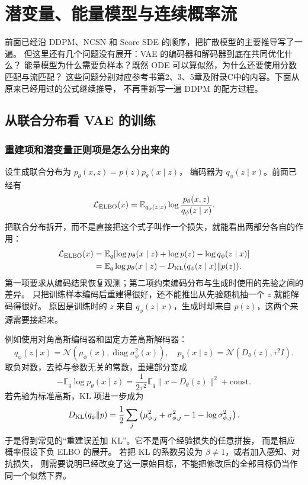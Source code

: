 \chapter{潜变量、能量模型与连续概率流}
\label{supp:objectives}

前面已经沿 DDPM、NCSN 和 Score SDE 的顺序，把扩散模型的主要推导写了一遍。
但这里还有几个问题没有展开：VAE 的编码器和解码器到底在共同优化什么？
能量模型为什么需要负样本？既然 ODE 可以算似然，为什么还要使用分数匹配与流匹配？
这些问题分别对应参考书第2、3、5章及附录C中的内容。下面从原来已经用过的公式继续推导，
不再重新写一遍 DDPM 的配方过程。\cite{theorybook}

\section{从联合分布看 VAE 的训练}
\subsection{重建项和潜变量正则项是怎么分出来的}
设生成联合分布为 $p_\theta(x,z)=p(z)p_\theta(x\mid z)$，
编码器为 $q_\phi(z\mid x)$。前面已经有
\[
\mathcal L_{\rm ELBO}(x)=\mathbb E_{q_\phi(z\mid x)}
 \log\frac{p_\theta(x,z)}{q_\phi(z\mid x)}.
\]
把联合分布拆开，而不是直接把这个式子叫作一个损失，就能看出两部分各自的作用：
\begin{align}
\mathcal L_{\rm ELBO}(x)
 &=\mathbb E_q[\log p_\theta(x\mid z)+\log p(z)-\log q_\phi(z\mid x)]\\
 &=\mathbb E_q\log p_\theta(x\mid z)
   -D_{\rm KL}(q_\phi(z\mid x)\|p(z)).
\label{supp:vae-decomposition}
\end{align}
第一项要求从编码结果恢复观测；第二项约束编码分布与生成时使用的先验之间的差异。
只把训练样本编码后重建得很好，还不能推出从先验随机抽一个 $z$ 就能解码得很好。
原因是训练时的 $z$ 来自 $q_\phi(z\mid x)$，生成时却来自 $p(z)$，这两个来源需要接起来。

例如使用对角高斯编码器和固定方差高斯解码器：
\[
q_\phi(z\mid x)=\mathcal N(\mu_\phi(x),\operatorname{diag}\sigma_\phi^2(x)),
\quad p_\theta(x\mid z)=\mathcal N(D_\theta(z),\tau^2I).
\]
取负对数，去掉与参数无关的常数，重建部分变成
\[
-\mathbb E_q\log p_\theta(x\mid z)
=\frac1{2\tau^2}\mathbb E_q\|x-D_\theta(z)\|^2+\text{const}.
\]
若先验为标准高斯，KL 项进一步成为
\[
D_{\rm KL}(q_\phi\|p)
=\frac12\sum_j\left(\mu_{\phi,j}^2+\sigma_{\phi,j}^2
 -1-\log\sigma_{\phi,j}^2\right).
\]
于是得到常见的“重建误差加 KL”。它不是两个经验损失的任意拼接，
而是相应概率假设下负 ELBO 的展开。
若把 KL 的系数另设为 $\beta\ne1$，或者加入感知、对抗损失，
则需要说明已经改变了这一原始目标，不能把修改后的全部目标仍当作同一个似然下界。

